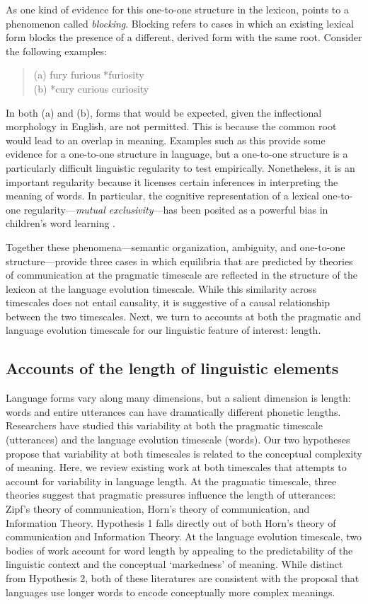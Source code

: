 As one kind of evidence for this one-to-one structure in the lexicon,  points to a phenomenon called {\it blocking}. Blocking refers to cases in which an existing lexical form blocks the presence of a different, derived form with the same root. Consider the following examples:
 \begin{quote}
 	(a) fury furious *furiosity\\
	(b) *cury curious curiosity
\end{quote}
In both (a) and (b), forms that would be expected, given the inflectional morphology in English, are not permitted. This is because the common root would lead to an overlap in meaning. Examples such as this provide some evidence for a one-to-one structure in language, but a one-to-one structure is a particularly difficult linguistic regularity to test empirically. Nonetheless, it is an important regularity because it licenses certain inferences in interpreting the meaning of words. In particular, the cognitive representation of a lexical one-to-one regularity---{\it mutual exclusivity}---has been posited as a powerful bias in children's word learning \cite{markman1988,markman2003}.

Together these phenomena---semantic organization, ambiguity, and one-to-one structure---provide three cases in which equilibria that are predicted by theories of communication at the pragmatic timescale are reflected in the structure of the lexicon at the language evolution timescale. While this similarity across timescales does not entail causality, it is suggestive of a causal relationship between the two timescales. Next, we turn to accounts at both the pragmatic and language evolution timescale for our linguistic feature of interest: length.

\subsection{Accounts of the length of linguistic elements}

Language forms vary along many dimensions, but a salient dimension is length: words and entire utterances can have dramatically different phonetic lengths. Researchers have studied this variability at both the pragmatic timescale (utterances) and the language evolution timescale (words). Our two hypotheses propose that variability at both timescales is related to the conceptual complexity of meaning. Here, we review existing work at both timescales that attempts to account for variability in language length. At the pragmatic timescale, three theories suggest that pragmatic pressures influence the length of utterances: Zipf's theory of communication, Horn's theory of communication, and Information Theory. Hypothesis 1 falls directly out of both Horn's theory of communication and Information Theory. At the language evolution timescale, two bodies of work account for word length by appealing to the predictability of the linguistic context and the conceptual `markedness' of meaning. While distinct from Hypothesis 2, both of these literatures are consistent with the proposal that languages use longer words to encode conceptually more complex meanings.

